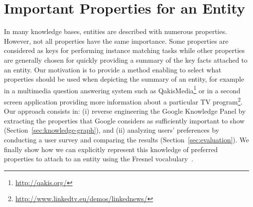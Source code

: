 \begin{figure}[!htbp]
\vspace{-2.5cm}
\end{figure}



\section{Important Properties for an Entity}
\label{sec:propEntities}
In many knowledge bases, entities are described with numerous properties. However, not all properties have the same importance. Some properties are considered as keys for performing instance matching tasks while other properties are generally chosen for quickly providing a summary of the key facts attached to an entity. Our motivation is to provide a method enabling to select what properties should be used when depicting the summary of an entity, for example in a multimedia question answering system such as QakisMedia\footnote{\url{http://qakis.org/}} or in a second screen application providing more information about a particular TV program\footnote{\url{http://www.linkedtv.eu/demos/linkednews/}}. Our approach consists in: (i) reverse engineering the Google Knowledge Panel by extracting the properties that Google considers as sufficiently important to show (Section~\ref{sec:knowledge-graph}), and (ii) analyzing users' preferences by conducting a user survey and comparing the results (Section~\ref{sec:evaluation}). We finally show how we can explicitly represent this knowledge of preferred properties to attach to an entity using the Fresnel vocabulary~\cite{pietriga2006}. \\

